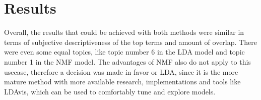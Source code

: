 \section{Results}
\label{sec:results}

Overall, the results that could be achieved with both methods were similar in terms of subjective descriptiveness of the top terms and amount of overlap.
There were even some equal topics, like topic number 6 in the LDA model and topic number 1 in the NMF model.
The advantages of NMF also do not apply to this usecase, therefore a decision was made in favor or LDA,
since it is the more mature method with more available research, implementations and tools like LDAvis, which can be used to comfortably
tune and explore models.
